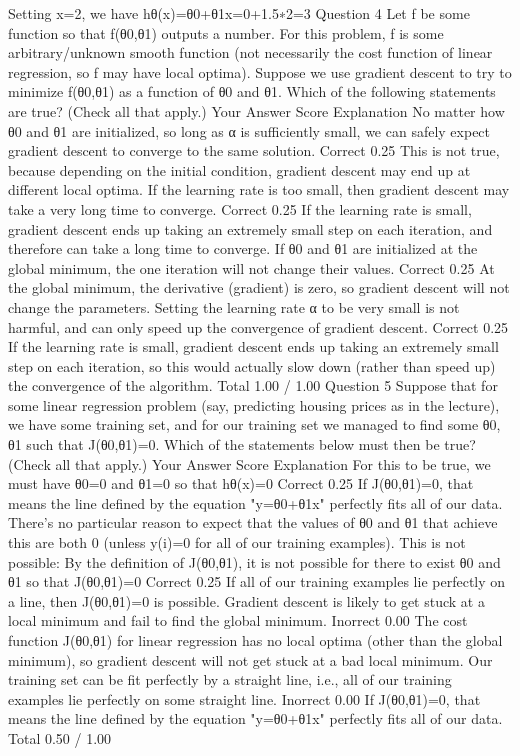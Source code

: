 Setting x=2, we have hθ(x)=θ0+θ1x=0+1.5∗2=3
Question 4
Let f be some function so that f(θ0,θ1) outputs a number. For this problem, f is some arbitrary/unknown smooth function (not necessarily the cost function of linear regression, so f may have local optima). Suppose we use gradient descent to try to minimize f(θ0,θ1) as a function of θ0 and θ1. Which of the following statements are true? (Check all that apply.)
Your Answer		Score	Explanation
No matter how θ0 and θ1 are initialized, so long as α is sufficiently small, we can safely expect gradient descent to converge to the same solution.	Correct	0.25	This is not true, because depending on the initial condition, gradient descent may end up at different local optima.
If the learning rate is too small, then gradient descent may take a very long time to converge.	Correct	0.25	If the learning rate is small, gradient descent ends up taking an extremely small step on each iteration, and therefore can take a long time to converge.
If θ0 and θ1 are initialized at the global minimum, the one iteration will not change their values.	Correct	0.25	At the global minimum, the derivative (gradient) is zero, so gradient descent will not change the parameters.
Setting the learning rate α to be very small is not harmful, and can only speed up the convergence of gradient descent.	Correct	0.25	If the learning rate is small, gradient descent ends up taking an extremely small step on each iteration, so this would actually slow down (rather than speed up) the convergence of the algorithm.
Total		1.00 / 1.00	
Question 5
Suppose that for some linear regression problem (say, predicting housing prices as in the lecture), we have some training set, and for our training set we managed to find some θ0, θ1 such that J(θ0,θ1)=0. Which of the statements below must then be true? (Check all that apply.)
Your Answer		Score	Explanation
For this to be true, we must have θ0=0 and θ1=0 so that hθ(x)=0	Correct	0.25	If J(θ0,θ1)=0, that means the line defined by the equation "y=θ0+θ1x" perfectly fits all of our data. There's no particular reason to expect that the values of θ0 and θ1 that achieve this are both 0 (unless y(i)=0 for all of our training examples).
This is not possible: By the definition of J(θ0,θ1), it is not possible for there to exist θ0 and θ1 so that J(θ0,θ1)=0	Correct	0.25	If all of our training examples lie perfectly on a line, then J(θ0,θ1)=0 is possible.
Gradient descent is likely to get stuck at a local minimum and fail to find the global minimum.	Inorrect	0.00	The cost function J(θ0,θ1) for linear regression has no local optima (other than the global minimum), so gradient descent will not get stuck at a bad local minimum.
Our training set can be fit perfectly by a straight line, i.e., all of our training examples lie perfectly on some straight line.	Inorrect	0.00	If J(θ0,θ1)=0, that means the line defined by the equation "y=θ0+θ1x" perfectly fits all of our data.
Total		0.50 / 1.00	
